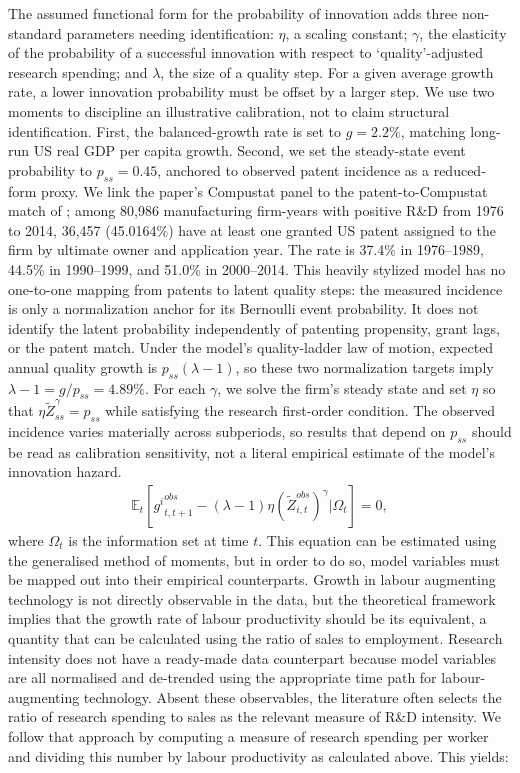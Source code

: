 \documentclass{_latex/house}
\begin{document}
The assumed functional form for the probability of innovation adds three non-standard parameters needing identification: $\eta$, a scaling constant; $\gamma$, the elasticity of the probability of a successful innovation with respect to \textquoteleft quality\textquoteright-adjusted research spending; and $\lambda$, the size of a quality step. For a given average growth rate, a lower innovation probability must be offset by a larger step. We use two moments to discipline an illustrative calibration, not to claim structural identification. First, the balanced-growth rate is set to $g=2.2\%$, matching long-run US real GDP per capita growth. Second, we set the steady-state event probability to $p_{ss}=0.45$, anchored to observed patent incidence as a reduced-form proxy. We link the paper's Compustat panel to the patent-to-Compustat match of \cite{dyevreSeagerPatentMatch}; among 80,986 manufacturing firm-years with positive R\&D from 1976 to 2014, 36,457 (45.0164\%) have at least one granted US patent assigned to the firm by ultimate owner and application year. The rate is 37.4\% in 1976--1989, 44.5\% in 1990--1999, and 51.0\% in 2000--2014. This heavily stylized model has no one-to-one mapping from patents to latent quality steps: the measured incidence is only a normalization anchor for its Bernoulli event probability. It does not identify the latent probability independently of patenting propensity, grant lags, or the patent match. Under the model's quality-ladder law of motion, expected annual quality growth is $p_{ss}(\lambda-1)$, so these two normalization targets imply $\lambda-1=g/p_{ss}=4.89\%$. For each $\gamma$, we solve the firm's steady state and set $\eta$ so that $\eta\tilde{Z}_{ss}^{\gamma}=p_{ss}$ while satisfying the research first-order condition. The observed incidence varies materially across subperiods, so results that depend on $p_{ss}$ should be read as calibration sensitivity, not a literal empirical estimate of the model's innovation hazard.
\begin{align*}
\mathbb{E}_{t}\left[{g^{i}}^{obs}_{t,t+1}-(\lambda-1)\eta (\tilde{Z}^{obs}_{i,t})^{\gamma} | \Omega_{t}\right]=0,
\end{align*}
where $\Omega_{t}$ is the information set at time $t$. This equation can be estimated using the generalised method of moments, but in order to do so, model variables must be mapped out into their empirical counterparts. Growth in labour augmenting technology is not directly observable in the data, but the theoretical framework implies that the growth rate of labour productivity should be its equivalent, a quantity that can be calculated using the ratio of sales to employment. Research intensity does not have a ready-made data counterpart because model variables are all normalised and de-trended using the appropriate time path for labour-augmenting technology. Absent these observables, the literature often selects the ratio of research spending to sales as the relevant measure of R\&D intensity. We follow that approach by computing a measure of research spending per worker and dividing this number by labour productivity as calculated above. This yields:
\end{document}
